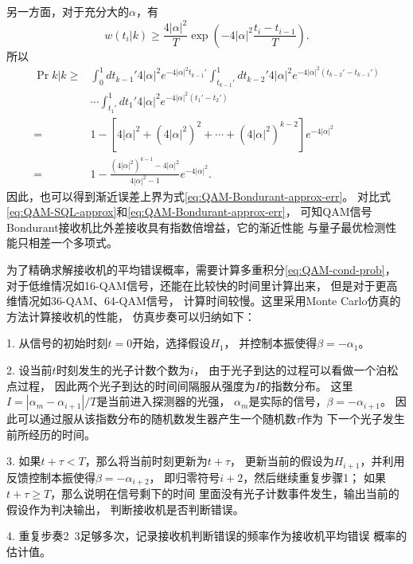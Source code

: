 另一方面，对于充分大的$\alpha$，有
\begin{equation}
w(t_i|k) \ge \frac{4|\alpha|^2}{T} \exp(-4|\alpha|^2 \frac{t_i-t_{i-1}}{T}) .
\end{equation}
所以
\begin{equation}
\begin{split}
\Pr{k|k} \ge & \int_{0}^1 dt_{k-1}' 4|\alpha|^2 e^{-4|\alpha|^2 t_{k-1}'}    \int_{t_{k-1}'}^1 dt_{k-2}'   4|\alpha|^2 e^{-4|\alpha|^2 (t_{k-2}'-t_{k-1}')} \\
           & \cdots    \int_{t_1'}^1 dt_1' 4|\alpha|^2 e^{-4|\alpha|^2 (t_1'-t_2')} \\
         = & 1- \left[ 4|\alpha|^2 + (4|\alpha|^2)^2 + \cdots + (4|\alpha|^2)^{k-2} \right] e^{-4|\alpha|^2}  \\
         = & 1 - \frac{(4|\alpha|^2)^{k-1}-4|\alpha|^2}{4|\alpha|^2-1} e^{-4|\alpha|^2}.
\end{split}
\end{equation}
因此，也可以得到渐近误差上界为式\ref{eq:QAM-Bondurant-approx-err}。
对比式\ref{eq:QAM-SQL-approx}和\ref{eq:QAM-Bondurant-approx-err}，
可知QAM信号Bondurant接收机比外差接收具有指数倍增益，它的渐近性能
与量子最优检测性能只相差一个多项式。


为了精确求解接收机的平均错误概率，需要计算多重积分\ref{eq:QAM-cond-prob}，
对于低维情况如16-QAM信号，还能在比较快的时间里计算出来，
但是对于更高维情况如36-QAM、64-QAM信号，
计算时间较慢。这里采用Monte Carlo仿真的方法计算接收机的性能，
仿真步奏可以归纳如下：

1. 从信号的初始时刻$t=0$开始，选择假设$H_1$，
   并控制本振使得$\beta=-\alpha_1$。
   
2. 设当前$t$时刻发生的光子计数个数为$i$，
   由于光子到达的过程可以看做一个泊松点过程，
   因此两个光子到达的时间间隔服从强度为$I$的指数分布\cite{hs2009sjgc}。
   这里$I=|\alpha_m-\alpha_{i+1}|/T$是当前进入探测器的光强，
   $\alpha_m$是实际的信号，$\beta = -\alpha_{i+1}$。
   因此可以通过服从该指数分布的随机数发生器产生一个随机数$\tau$作为
   下一个光子发生前所经历的时间。

3. 如果$t+\tau<T$，那么将当前时刻更新为$t + \tau$，
   更新当前的假设为$H_{i+1}$，并利用反馈控制本振使得$\beta = -\alpha_{i+2}$，
   即归零符号$i+2$，然后继续重复步骤1；
   如果$t+\tau \ge T$，那么说明在信号剩下的时间
   里面没有光子计数事件发生，输出当前的假设作为判决输出，
   判断接收机是否判断错误。
   
4. 重复步奏2~3足够多次，记录接收机判断错误的频率作为接收机平均错误
   概率的估计值。
   
